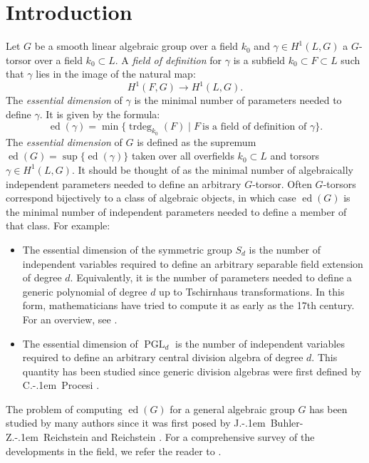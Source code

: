 \documentclass[12pt]{amsart}
\numberwithin{equation}{section}
\theoremstyle{definition}
\newcommand{\PGL}{\operatorname{PGL}}
\newcommand{\trdeg}{\operatorname{trdeg}}
\newcommand{\ed}{\operatorname{ed}}
\begin{document}
\maketitle

\setcounter{tocdepth}{1}
\tableofcontents

\section{Introduction}

Let $G$ be a smooth linear algebraic group over a field $k_0$ and $\gamma\in H^1(L,G)$ a $G$-torsor over a field $k_0\subset L$. A \emph{field of definition} for $\gamma$ is a subfield $k_0\subset F \subset L$ such that $\gamma$ lies in the image of the natural map:
$$H^1(F,G) \to H^1(L,G).$$
The \emph{essential dimension} of $\gamma$ is the minimal number of parameters needed to define $\gamma$. It is given by the formula:
$$\ed(\gamma) = \min \Big\{ \trdeg_{k_0}(F) \mid F \   \text{is a field of definition of }\gamma \Big\}.$$
The \emph{essential dimension} of $G$ is  defined as the supremum $ \ed(G) = \sup\{\ed(\gamma)\}$ taken over all overfields $k_0\subset L$ and torsors $\gamma\in H^1(L,G)$. It should be thought of as the minimal number of algebraically independent parameters needed to define an arbitrary $G$-torsor. Often $G$-torsors correspond bijectively to a class of algebraic objects, in which case $\ed(G)$ is the minimal number of independent parameters needed to define a member of that class. For example:
\begin{itemize}
    \item The essential dimension of the symmetric group $S_d$ is the number of independent variables required to define an arbitrary separable field extension of degree $d$. Equivalently, it is the number of parameters needed to define a generic polynomial of degree $d$ up to Tschirnhaus transformations. In this form, mathematicians have tried to compute it as early as the 17th century. For an overview, see \cite{garver1927tschirnhaus,buhler1999,buhler1997essential}.
    \item The essential dimension of $\PGL_d$ is the number of independent variables required to define an arbitrary central division algebra of degree $d$. This quantity has been studied since generic division algebras were first defined by C.\kern-.1em\ Procesi \cite[Section 2]{procesi}.
\end{itemize} 
The problem of computing $\ed(G)$ for a general algebraic group $G$ has been studied by many authors since it was first posed by J.\kern-.1em\ Buhler-Z.\kern-.1em\ Reichstein \cite{buhler1997essential} and Reichstein \cite{reichstein2000notion}. For a comprehensive survey of the developments in the field, we refer the reader to \cite{merkurjev-survey}. 
\end{document}
